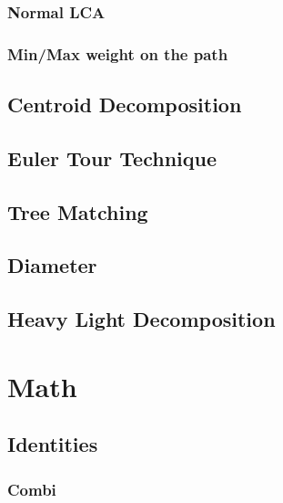 	\subsubsection{Normal LCA}
	\subsubsection{Min/Max weight on the path}
	\subsection{Centroid Decomposition}
	\subsection{Euler Tour Technique}
	\subsection{Tree Matching}
	\subsection{Diameter}
	\subsection{Heavy Light Decomposition}
	
	\section{Math}
	
	\subsection{Identities}
	
	\subsubsection{Combi}
	
